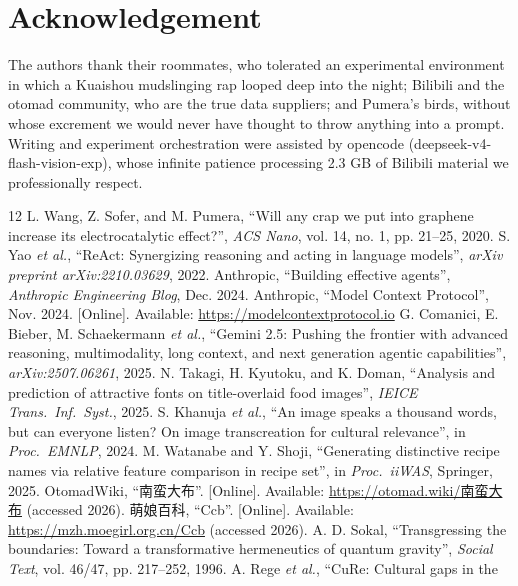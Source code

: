 \documentclass[conference,10pt]{IEEEtran}
\begin{document}
\section{Acknowledgement}
The authors thank their roommates, who tolerated an experimental
environment in which a Kuaishou mudslinging rap looped deep into the
night; Bilibili and the otomad community, who are the true data
suppliers; and Pumera's birds, without whose excrement we would never
have thought to throw anything into a prompt. Writing and experiment
orchestration were assisted by opencode (deepseek-v4-flash-vision-exp),
whose infinite patience processing 2.3 GB of Bilibili material we
professionally respect.

\begin{thebibliography}{12}
 L. Wang, Z. Sofer, and M. Pumera, ``Will any crap
we put into graphene increase its electrocatalytic effect?'', \emph{ACS
Nano}, vol. 14, no. 1, pp. 21--25, 2020.
 S. Yao \emph{et al.}, ``ReAct: Synergizing
reasoning and acting in language models'', \emph{arXiv preprint
arXiv:2210.03629}, 2022.
 Anthropic, ``Building effective agents'',
\emph{Anthropic Engineering Blog}, Dec. 2024.
 Anthropic, ``Model Context Protocol'', Nov. 2024.
[Online]. Available: \url{https://modelcontextprotocol.io}
 G. Comanici, E. Bieber, M. Schaekermann
\emph{et al.}, ``Gemini 2.5: Pushing the frontier with advanced
reasoning, multimodality, long context, and next generation agentic
capabilities'', \emph{arXiv:2507.06261}, 2025.
 N. Takagi, H. Kyutoku, and K. Doman, ``Analysis
and prediction of attractive fonts on title-overlaid food images'',
\emph{IEICE Trans.\ Inf.\ Syst.}, 2025.
 S. Khanuja \emph{et al.}, ``An image speaks a
thousand words, but can everyone listen? On image transcreation for
cultural relevance'', in \emph{Proc.\ EMNLP}, 2024.
 M. Watanabe and Y. Shoji, ``Generating
distinctive recipe names via relative feature comparison in recipe
set'', in \emph{Proc.\ iiWAS}, Springer, 2025.
 OtomadWiki, ``南蛮大布''. [Online]. Available:
\url{https://otomad.wiki/南蛮大布} (accessed 2026).
 萌娘百科, ``Ccb''. [Online]. Available:
\url{https://mzh.moegirl.org.cn/Ccb} (accessed 2026).
 A. D. Sokal, ``Transgressing the boundaries:
Toward a transformative hermeneutics of quantum gravity'', \emph{Social
Text}, vol. 46/47, pp. 217--252, 1996.
 A. Rege \emph{et al.}, ``CuRe: Cultural gaps in the

\end{thebibliography}
\end{document}
